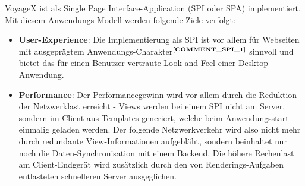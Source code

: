 VoyageX ist als Single Page Interface-Application (SPI oder SPA) implementiert. Mit diesem Anwendungs-Modell werden folgende Ziele verfolgt:

\begin{itemize}[leftmargin=*,noitemsep,topsep=1ex,parsep=0pt,partopsep=0pt]
\item \textbf{User-Experience}: Die Implementierung als SPI ist vor allem für Webseiten mit ausgeprägtem Anwendungs-Charakter$^{\textbf{\ref{COMMENT_SPI_1}}}$ sinnvoll und bietet das für einen Benutzer vertraute Look-and-Feel einer Desktop-Anwendung.%
\addtocounter{footnote}{1}
\item \textbf{Performance}: Der Performancegewinn wird vor allem durch die Reduktion der Netzwerklast erreicht - Views werden bei einem SPI nicht am Server, sondern im Client aus Templates generiert, welche beim Anwendungsstart einmalig geladen werden. Der folgende Netzwerkverkehr wird also nicht mehr durch redundante View-Informationen aufgebläht, sondern beinhaltet nur noch die Daten-Synchronisation mit einem Backend. Die höhere Rechenlast am Client-Endgerät wird zusätzlich durch den von Renderings-Aufgaben entlasteten schnelleren Server ausgeglichen.
\end{itemize}




